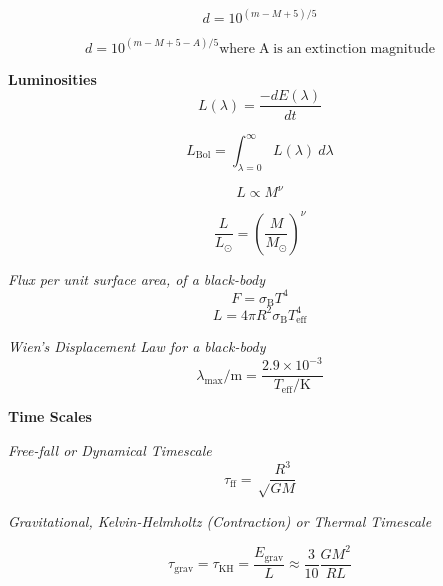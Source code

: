 \documentclass{article}
\begin{document}
\begin{equation}
d = 10^{(m-M+5)/5}
\end{equation}

\begin{equation}
d = 10^{(m-M+5-A)/5} \mathrm{where \; A \; is \; an \; extinction \; magnitude}
\end{equation}

\textbf {Luminosities}
\begin{equation}
L(\lambda) = \frac {-dE(\lambda)}{dt}
\end{equation}

\begin{equation}
L_\mathrm{Bol} = \int_{\lambda = 0}^{\infty} L(\lambda)\ d\lambda
\end{equation}

\begin{equation}
L \propto M^\nu
\end{equation}

\begin{equation}
\frac {L}{L_\odot} = \left(\frac {M}{M_\odot}\right)^\nu
\end{equation}
\begin{center}
\end{center}

\textit{Flux per unit surface area, of a black-body}
\begin{equation}
F = \sigma_\mathrm{B} T^4
\end{equation}
\begin{equation}
L = 4 \pi R^2 \sigma_\mathrm{B} T^4_\mathrm{eff}
\end{equation}

\textit{Wien's Displacement Law for a black-body}
\begin{equation}
\lambda_\mathrm{max}/\mathrm{m} = \frac{2.9 \times 10^{-3}}{T_\mathrm{eff}/\mathrm{K}}
\end{equation}

\textbf {Time Scales}

\textit {Free-fall or Dynamical Timescale}
\begin{equation}
\tau_\mathrm{ff} = \sqrt \frac {R^3}{G M}
\end{equation}

\textit {Gravitational, Kelvin-Helmholtz (Contraction) or Thermal Timescale}

\begin{equation}
\tau_\mathrm{grav} = \tau_\mathrm{KH} = \frac {E_\mathrm{grav}}{L} \approx \frac{3}{10} \frac{G M^2}{R L}
\end{equation}
\end{document}
